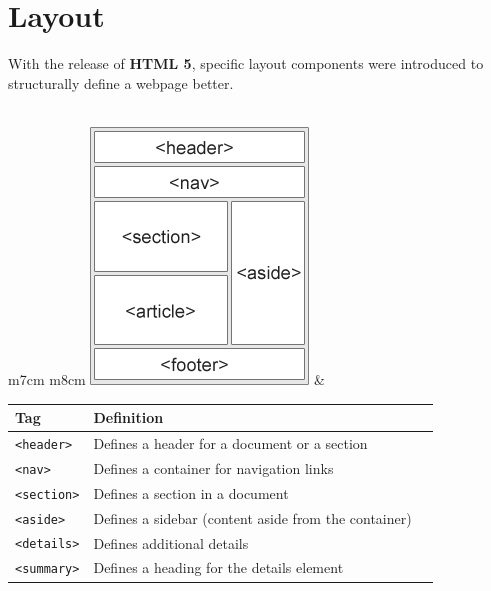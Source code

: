 \documentclass[11pt, letterpaper]{article}
\begin{document}
	\section{Layout}
		With the release of \textbf{HTML 5}, specific layout components were introduced to structurally define a webpage better.\\\\

		\centering
		\begin{tabular}{m{7cm} m{8cm}}
			\includegraphics[scale = 1.3]{layout} & 
			\begin{tabular}{l p{5cm} l}
				\toprule
				Tag & Definition \\\midrule
				\texttt{<header>} & Defines a header for a document or a section \\\midrule
				\texttt{<nav>} & Defines a container for navigation links \\\midrule
				\texttt{<section>} & Defines a section in a document \\\midrule
				\texttt{<aside>} & Defines a sidebar (content aside from the container) \\\midrule
				\texttt{<details>} & Defines additional details \\\midrule
				\texttt{<summary>} & Defines a heading for the details element \\
				\bottomrule
			\end{tabular}
		\end{tabular}
\end{document}
